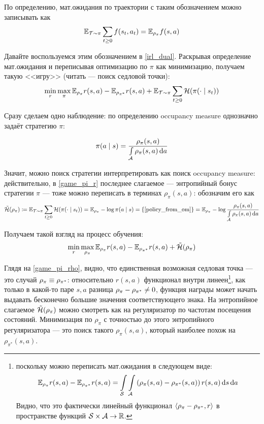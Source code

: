 По определению, мат.ожидания по траектории с таким обозначением можно записывать как
$$\mathbb{E}_{\mathcal{T} \sim \pi} \sum_{t \ge 0} f(s_t, a_t) = \mathbb{E}_{\rho_{\pi}} f(s, a)$$

Давайте воспользуемся этим обозначением в \eqref{irl_dual}. Раскрывая определение мат.ожидания и переписывая оптимизацию по $\pi$ как минимизацию, получаем такую <<игру>> (читать --- поиск седловой точки):
\begin{equation}\label{game_pi_r}
\min\limits_{r} \max\limits_{\pi} \mathbb{E}_{\rho_{\pi}} r(s, a) - \mathbb{E}_{\rho_{\pi^*}} r(s, a) + \mathbb{E}_{\mathcal{T} \sim \pi} \sum_{t \ge 0} \mathcal{H}(\pi(\cdot \mid s_t))
\end{equation}

Сразу сделаем одно наблюдение: по определению occupancy measure однозначно задаёт стратегию $\pi$:

\begin{proposition}
\begin{equation}\label{policy_from_om}
\pi(a \mid s) = \frac{\rho_\pi(s, a)}{\int\limits_{\mathcal{A}} \rho_\pi(s, a) \mathop{}\!\mathrm{d} a}
\end{equation}
\end{proposition}

Значит, можно поиск стратегии интерпретировать как поиск occupancy measure: действительно, в \eqref{game_pi_r} последнее слагаемое --- энтропийный бонус стратегии $\pi$ --- тоже можно переписать в терминах $\rho_\pi(s, a)$: обозначим его как
$$\tilde{\mathcal{H}}(\rho_\pi) \coloneqq \mathbb{E}_{\mathcal{T} \sim \pi} \sum_{t \ge 0} \mathcal{H}(\pi(\cdot \mid s_t)) = \mathbb{E}_{\rho_\pi} -\log \pi(a \mid s) = \{ \text{\eqref{policy_from_om}} \} = \mathbb{E}_{\rho_\pi} -\log \frac{\rho_\pi(s, a)}{\int\limits_{\mathcal{A}} \rho_\pi(s, a) \mathop{}\!\mathrm{d} a}$$

Получаем такой взгляд на процесс обучения:
\begin{equation}\label{game_pi_rho}
\min\limits_{r} \max\limits_{\rho_\pi} \mathbb{E}_{\rho_{\pi}} r(s, a) - \mathbb{E}_{\rho_{\pi^*}} r(s, a) + \tilde{\mathcal{H}}(\rho_\pi)
\end{equation}

Глядя на \eqref{game_pi_rho}, видно, что единственная возможная седловая точка --- это случай $\rho_{\pi} \HM\equiv \rho_{\pi^*}$: относительно $r(s, a)$ функционал внутри линеен\footnote{поскольку можно переписать мат.ожидания в следующем виде:
$$\mathbb{E}_{\rho_{\pi}} r(s, a) - \mathbb{E}_{\rho_{\pi^*}} r(s, a) = \int\limits_{\mathcal{S}} \int\limits_{\mathcal{A}} \left(\rho_{\pi}(s, a) - \rho_{\pi^*}(s, a)\right) r(s, a) \mathop{}\!\mathrm{d} s \mathop{}\!\mathrm{d} a$$
Видно, что это фактически линейный функционал $\langle \rho_{\pi} \HM- \rho_{\pi^*},  r\rangle$ в пространстве функций $\St \HM\times \A \HM\to \R$.}, как только в какой-то паре $s, a$ разница $\rho_{\pi} \HM - \rho_{\pi^*} \HM\neq 0$, функция награды может начать выдавать бесконечно большие значения соответствующего знака. На энтропийное слагаемое $\tilde{\mathcal{H}}(\rho_\pi)$ можно смотреть как на регуляризатор по частотам посещения состояний. Минимизация по $\rho_\pi$ с точностью до этого энтропийного регуляризатора --- это поиск такого $\rho_\pi(s, a)$, который наиболее похож на $\rho_{\pi^*}(s, a)$.

